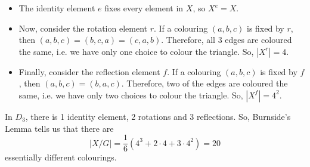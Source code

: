 \documentclass[a4paper, openany]{memoir}
\theoremstyle{definition}
\theoremstyle{plain}
\begin{document}
\begin{itemize}
    \item The identity element $e$ fixes every element in $X$, so $X^e = X$.
    \item Now, consider the rotation element $r$. If a colouring $(a, b, c)$ is fixed by $r$, then $(a, b, c) = (b, c, a) = (c, a, b)$. Therefore, all 3 edges are coloured the same, i.e. we have only one choice to colour the triangle. So, $|X^r| = 4$.
    \item Finally, consider the reflection element $f$. If a colouring $(a, b, c)$ is fixed by $f$, then $(a, b, c) = (b, a, c)$. Therefore, two of the edges are coloured the same, i.e. we have only two choices to colour the triangle. So, $|X^f| = 4^2$.
\end{itemize}
\noindent In $D_3$, there is 1 identity element, 2 rotations and 3 reflections. So, Burnside's Lemma tells us that there are
\[|X/G| = \frac{1}{6} (4^3 + 2 \cdot 4 + 3 \cdot 4^2) = 20\]
essentially different colourings.

\newpage
\end{document}
